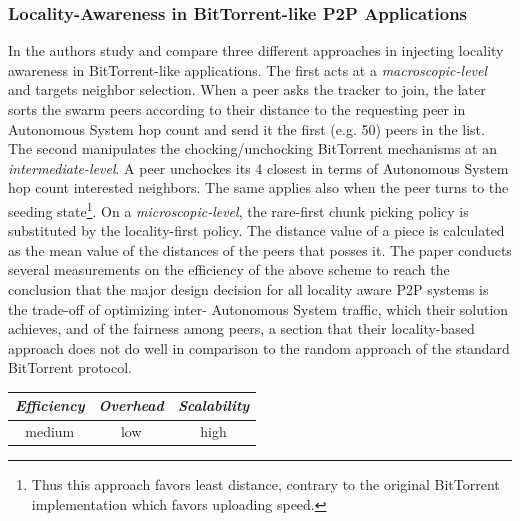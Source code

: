 \subsubsection{Locality-Awareness in BitTorrent-like P2P Applications}
In \cite{LCLX2009} the authors study and compare three different
approaches in injecting locality awareness in BitTorrent-like applications. The
first acts at a \emph{macroscopic-level} and targets neighbor selection. When a
peer asks the tracker to join, the later sorts the swarm peers according to
their distance to the requesting peer in Autonomous System hop count and send it
the first
(e.g. 50) peers in the list. The second manipulates the chocking/unchocking
BitTorrent mechanisms at an \emph{intermediate-level}. A peer unchockes its 4
closest in terms of Autonomous System hop count interested neighbors. The same
applies also
when the peer turns to the seeding state\footnote{Thus this approach favors
least distance, contrary to the original BitTorrent implementation which favors
uploading speed.}. On a \emph{microscopic-level}, the rare-first chunk picking
policy is substituted by the locality-first policy. The distance value of a
piece is calculated as the mean value of the distances of the peers that posses
it. The paper conducts several measurements on the efficiency of the above
scheme to reach the conclusion that the major design decision for all locality
aware P2P systems is the trade-off of optimizing inter- Autonomous System
traffic, which their solution achieves, and of the fairness among peers, a
section that their locality-based approach does not do well in comparison to the
random approach of the standard BitTorrent protocol.

\begin{center}
\begin{tabular}{ccc}
\emph{Efficiency} & \emph{Overhead} & \emph{Scalability} \\
\hline
medium &
low &
%
high
\end{tabular}
\end{center}

